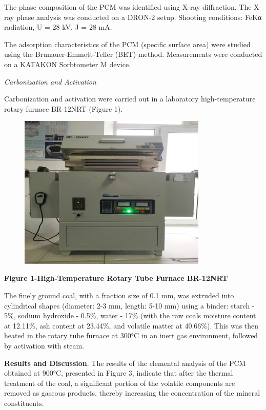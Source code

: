 The phase composition of the PCM was identified using X-ray diffraction.
The X-ray phase analysis was conducted on a DRON-2 setup. Shooting
conditions: FeKα radiation, U = 28 kV, J = 28 mA.

The adsorption characteristics of the PCM (specific surface area) were
studied using the Brunauer-Emmett-Teller (BET) method. Measurements were
conducted on a KATAKON Sorbtometer M device.

\emph{Carbonization and Activation}

Carbonization and activation were carried out in a laboratory
high-temperature rotary furnace BR-12NRT (Figure 1).

\begin{figure}[H]
	\centering
	\includegraphics[width=0.8\textwidth]{assets/1066}
	\caption*{}
\end{figure}

{\bfseries Figure 1-High-Temperature Rotary Tube Furnace BR-12NRT}

The finely ground coal, with a fraction size of 0.1 mm, was extruded
into cylindrical shapes (diameter: 2-3 mm, length: 5-10 mm) using a
binder: starch - 5\%, sodium hydroxide - 0.5\%, water - 17\% (with the
raw coal\textquotesingle s moisture content at 12.11\%, ash content at
23.44\%, and volatile matter at 40.66\%). This was then heated in the
rotary tube furnace at 300°C in an inert gas environment, followed by
activation with steam.

{\bfseries Results and Discussion}. The results of the elemental analysis
of the PCM obtained at 900°C, presented in Figure 3, indicate that after
the thermal treatment of the coal, a significant portion of the volatile
components are removed as gaseous products, thereby increasing the
concentration of the mineral constituents.

